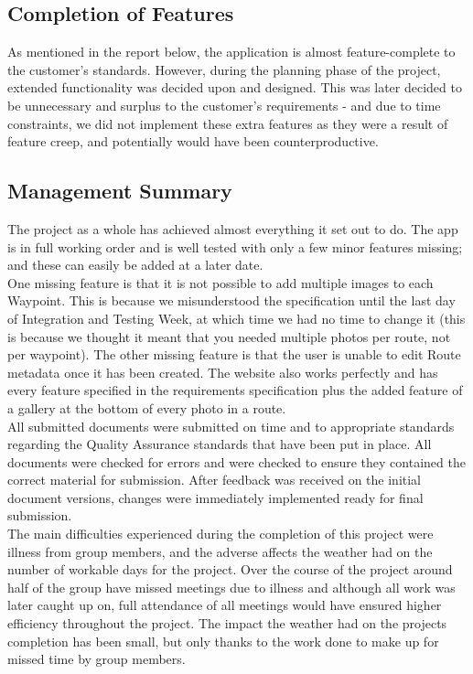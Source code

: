 \documentclass{article}
\begin{document}
		\subsection{Completion of Features}
		As mentioned in the report below, the application is almost feature-complete to the customer's standards. However, during the planning phase of the project, extended functionality was decided upon and designed. This was later decided to be unnecessary and surplus to the customer's requirements - and due to time constraints, we did not implement these extra features as they were a result of feature creep, and potentially would have been counterproductive.
		
		\subsection{Management Summary}
		The project as a whole has achieved almost everything it set out to do. The app is in full working order and is well tested with only a few minor features missing; and these can easily be added at a later date. \\
		
		One missing feature is that it is not possible to add multiple images to each Waypoint. This is because we misunderstood the specification until the last day of Integration and Testing Week, at which time we had no time to change it (this is because we thought it meant that you needed multiple photos per route, not per waypoint). The other missing feature is that the user is unable to edit Route metadata once it has been created. The website also works perfectly and has every feature specified in the requirements specification plus the added feature of a gallery at the bottom of every photo in a route. \\

		All submitted documents were submitted on time and to appropriate standards regarding the Quality Assurance standards that have been put in place. All documents were checked for errors and were checked to ensure they contained the correct material for submission. After feedback was received on the initial document versions, changes were immediately implemented ready for final submission. \\

		The main difficulties experienced during the completion of this project were illness from group members, and the adverse affects the weather had on the number of workable days for the project. Over the course of the project around half of the group have missed meetings due to illness and although all work was later caught up on, full attendance of all meetings would have ensured higher efficiency throughout the project. The impact the weather had on the projects completion has been small, but only thanks to the work done to make up for missed time by group members. \\
\end{document}
